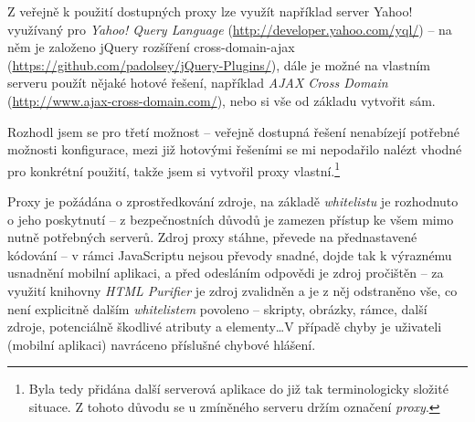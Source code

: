 Z veřejně k použití dostupných proxy lze využít například server Yahoo! využívaný pro \textit{Yahoo! Query Language} (\url{http://developer.yahoo.com/yql/}) -- na něm je založeno jQuery rozšíření cross-domain-ajax (\url{https://github.com/padolsey/jQuery-Plugins/}), dále je možné na vlastním serveru použít nějaké hotové řešení, například \textit{AJAX Cross Domain} (\url{http://www.ajax-cross-domain.com/}), nebo si vše od základu vytvořit sám.

Rozhodl jsem se pro třetí možnost -- veřejně dostupná řešení nenabízejí potřebné možnosti konfigurace, mezi již hotovými řešeními se mi nepodařilo nalézt vhodné pro konkrétní použití, takže jsem si vytvořil proxy vlastní.\footnote{Byla tedy přidána další serverová aplikace do již tak terminologicky složité situace. Z tohoto důvodu se u zmíněného serveru držím označení \textit{proxy}.}

Proxy je požádána o zprostředkování zdroje, na základě \textit{whitelistu} je rozhodnuto o jeho poskytnutí -- z bezpečnostních důvodů je zamezen přístup ke všem mimo nutně potřebných serverů. Zdroj proxy stáhne, převede na přednastavené kódování -- v rámci JavaScriptu nejsou převody snadné, dojde tak k výraznému usnadnění mobilní aplikaci, a před odesláním odpovědi je zdroj pročištěn -- za využití knihovny \textit{HTML Purifier} je zdroj zvalidněn a je z něj odstraněno vše, co není explicitně dalším \textit{whitelistem} povoleno -- skripty, obrázky, rámce, další zdroje, potenciálně škodlivé atributy a elementy\dots V případě chyby je uživateli (mobilní aplikaci) navráceno příslušné chybové hlášení.


